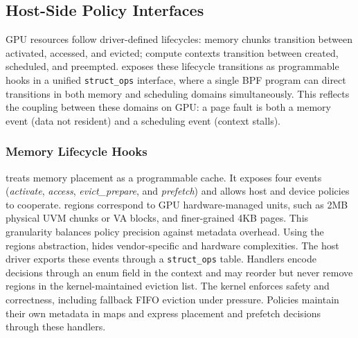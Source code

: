 

\subsection{Host-Side Policy Interfaces}
\label{sec:design-interfaces}

GPU resources follow driver-defined lifecycles: memory chunks transition between activated, accessed, and evicted; compute contexts transition between created, scheduled, and preempted. \sys exposes these lifecycle transitions as programmable hooks in a unified \texttt{struct\_ops} interface, where a single BPF program can direct transitions in both memory and scheduling domains simultaneously. This reflects the coupling between these domains on GPU: a page fault is both a memory event (data not resident) and a scheduling event (context stalls).

\subsubsection{Memory Lifecycle Hooks}
\label{sec:design-mem}

\sys treats memory placement as a programmable cache. It exposes four events (\emph{activate}, \emph{access}, \emph{evict\_prepare}, and \emph{prefetch}) and allows host and device policies to cooperate. \sys regions correspond to GPU hardware-managed units, such as 2MB physical UVM chunks or VA blocks, and finer-grained 4KB pages. This granularity balances policy precision against metadata overhead. Using the regions abstraction, \sys hides vendor-specific and hardware complexities. The host driver exports these events through a \texttt{struct\_ops} table. Handlers encode decisions through an enum field in the context and may reorder but never remove regions in the kernel-maintained eviction list. The kernel enforces safety and correctness, including fallback FIFO eviction under pressure. Policies maintain their own metadata in maps and express placement and prefetch decisions through these handlers.

